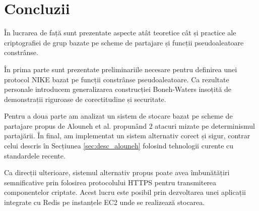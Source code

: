 \documentclass[oneside, 12pt]{book}
\begin{document}
\chapter*{Concluzii}

În lucrarea de față sunt prezentate aspecte atât teoretice cât și practice ale criptografiei de grup bazate pe scheme de partajare și funcții pseudoaleatoare constrânse.

În prima parte sunt prezentate preliminariile necesare pentru definirea unei protocol NIKE bazat pe funcții constrânse pseudoaleatoare. Ca rezultate personale introducem generalizarea construcției Boneh-Waters insoțită de demonstrații riguroase de corectitudine și securitate.

Pentru a doua parte am analizat un sistem de stocare bazat pe scheme de partajare propus de Alouneh et al. propunând $2$ atacuri mizate pe determinismul partajării. În final, am implementat un sistem alternativ corect și sigur, contrar celui descris în Secțiunea \ref{sec:desc_alouneh} folosind tehnologii curente cu standardele recente.

Ca direcții ulterioare, sistemul alternativ propus poate avea îmbunătățiri semnificative prin folosirea protocolului HTTPS pentru transmiterea componentelor criptate. Acest lucru este posibil prin dezvoltarea unei aplicații integrate cu Redis pe instanțele EC2 unde se realizează stocarea.



\clearpage



\end{document}
